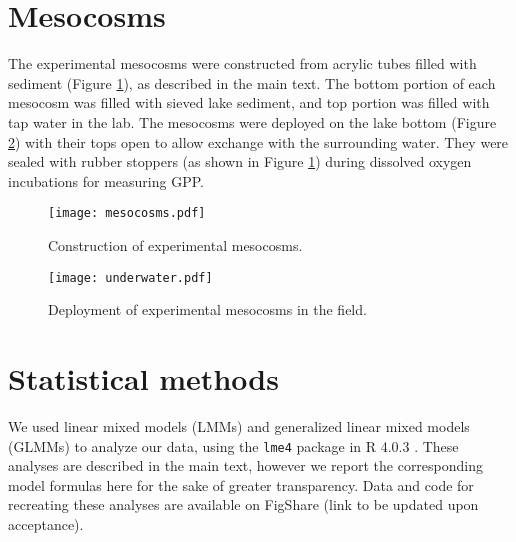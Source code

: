 \documentclass[12pt]{article}
\begin{document}
\clearpage

\section*{Mesocosms}

The experimental mesocosms were constructed from acrylic tubes filled with sediment
(Figure \ref{fig:photo1}),
as described in the main text.
The bottom portion of each mesocosm was filled with sieved lake sediment,
and top portion was filled with tap water in the lab.
The mesocosms were deployed on the lake bottom (Figure \ref{fig:photo2})
with their tops open to allow exchange with the surrounding water.
They were sealed with rubber stoppers (as shown in Figure \ref{fig:photo1})
during dissolved oxygen incubations for measuring GPP.


\clearpage

\begin{figure}
\centering
\texttt{[image: mesocosms.pdf]}
\caption{\label{fig:photo1}
Construction of experimental mesocosms.
}
\end{figure}

\begin{figure}
\centering
\texttt{[image: underwater.pdf]}
\caption{\label{fig:photo2}
Deployment of experimental mesocosms in the field.
}
\end{figure}

\clearpage

\section*{Statistical methods}

We used linear mixed models (LMMs) and generalized linear mixed models (GLMMs)
to analyze our data, using the \texttt{lme4} package \citep{lme4} 
in R 4.0.3 \citep{r2020}.
These analyses are described in the main text,
however we report the corresponding model formulas here for the sake of greater transparency.
Data and code for recreating these analyses are available on FigShare 
(link to be updated upon acceptance).
\end{document}

